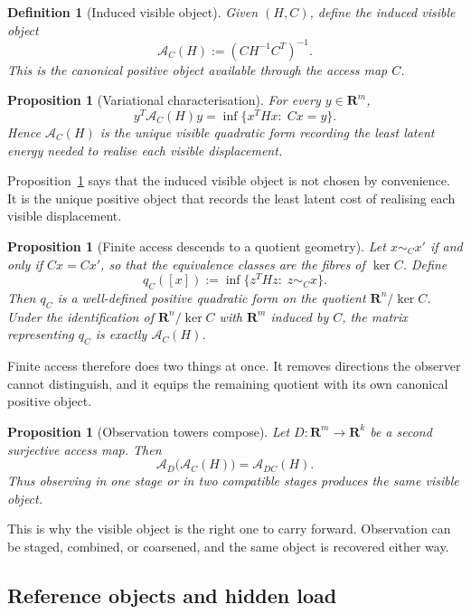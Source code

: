 \documentclass[11pt,a4paper]{article}
\numberwithin{equation}{section}
\newcommand{\R}{\mathbf R}
\newcommand{\Aobs}{\mathcal A}
\theoremstyle{thmcompact}
\newtheorem{proposition}[theorem]{Proposition}
\newtheorem{definition}[theorem]{Definition}
\theoremstyle{remark}
\begin{document}
\begin{definition}[Induced visible object]
\label{def:induced-visible-object}
Given \((H,C)\), define the induced visible object
\[
\Aobs_C(H):=(CH^{-1}C^T)^{-1}.
\]
This is the canonical positive object available through the access map \(C\).
\end{definition}

\begin{proposition}[Variational characterisation]
\label{prop:variational}
For every \(y\in\R^m\),
\[
y^T\Aobs_C(H)y=\inf\{x^THx:\;Cx=y\}.
\]
Hence \(\Aobs_C(H)\) is the unique visible quadratic form recording the least latent energy needed to realise each visible displacement.
\end{proposition}

Proposition~\ref{prop:variational} says that the induced visible object is not chosen by convenience. It is the unique positive object that records the least latent cost of realising each visible displacement.

\begin{proposition}[Finite access descends to a quotient geometry]
\label{prop:quotient-geometry}
Let \(x\sim_C x'\) if and only if \(Cx=Cx'\), so that the equivalence classes are the fibres of \(\ker C\). Define
\[
q_C([x]):=\inf\{z^THz:\;z\sim_C x\}.
\]
Then \(q_C\) is a well-defined positive quadratic form on the quotient \(\R^n/\ker C\). Under the identification of \(\R^n/\ker C\) with \(\R^m\) induced by \(C\), the matrix representing \(q_C\) is exactly \(\Aobs_C(H)\).
\end{proposition}

Finite access therefore does two things at once. It removes directions the observer cannot distinguish, and it equips the remaining quotient with its own canonical positive object.

\begin{proposition}[Observation towers compose]
\label{prop:composition}
Let \(D:\R^m\to\R^k\) be a second surjective access map. Then
\[
\Aobs_D\bigl(\Aobs_C(H)\bigr)=\Aobs_{DC}(H).
\]
Thus observing in one stage or in two compatible stages produces the same visible object.
\end{proposition}

This is why the visible object is the right one to carry forward. Observation can be staged, combined, or coarsened, and the same object is recovered either way.

\subsection{Reference objects and hidden load}
\end{document}

